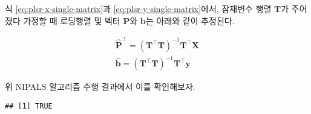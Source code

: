 \documentclass[]{book}
\newenvironment{Shaded}{\begin{snugshade}}{\end{snugshade}}
\newcommand{\DataTypeTok}[1]{\textcolor[rgb]{0.13,0.29,0.53}{#1}}
\newcommand{\DecValTok}[1]{\textcolor[rgb]{0.00,0.00,0.81}{#1}}
\newcommand{\KeywordTok}[1]{\textcolor[rgb]{0.13,0.29,0.53}{\textbf{#1}}}
\newcommand{\NormalTok}[1]{#1}
\newcommand{\OperatorTok}[1]{\textcolor[rgb]{0.81,0.36,0.00}{\textbf{#1}}}
\newcommand{\StringTok}[1]{\textcolor[rgb]{0.31,0.60,0.02}{#1}}
\begin{document}
식 \eqref{eq:plsr-x-single-matrix}과 \eqref{eq:plsr-y-single-matrix}에서, 잠재변수 행렬 \(\mathbf{T}\)가 주어졌다 가정할 때 로딩행렬 및 벡터 \(\mathbf{P}\)와 \(\mathbf{b}\)는 아래와 같이 추정된다.

\begin{eqnarray}
\hat{\mathbf{P}}^\top = \left(\mathbf{T}^\top \mathbf{T}\right)^{-1} \mathbf{T}^\top \mathbf{X} \label{eq:plsr-x-single-loading-est}\\
\hat{\mathbf{b}} = \left(\mathbf{T}^\top \mathbf{T}\right)^{-1} \mathbf{T}^\top \mathbf{y} \label{eq:plsr-y-single-loading-est}
\end{eqnarray}

위 NIPALS 알고리즘 수행 결과에서 이를 확인해보자.

\begin{Shaded}
\end{Shaded}

\begin{verbatim}
## [1] TRUE
\end{verbatim}

\begin{Shaded}
\end{Shaded}
\end{document}
